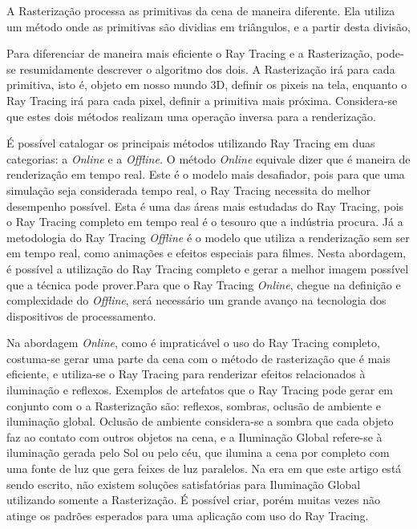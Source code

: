 \documentclass[journal]{IEEEtran}
\begin{document}
A Rasterização processa as primitivas da cena de maneira diferente. Ela
utiliza um método onde as primitivas são dividias em triângulos, e a partir desta
divisão, 

Para diferenciar de maneira mais eficiente o Ray Tracing e a Rasterização, pode-se
resumidamente descrever o algoritmo dos dois. A Rasterização irá  para cada
primitiva, isto é, objeto em nosso mundo 3D, definir os pixeis na tela, enquanto
o Ray Tracing irá para cada pixel, definir a primitiva mais próxima. Considera-se
que estes dois métodos realizam uma operação inversa para a renderização.
\cite{c11}

É possível catalogar os principais métodos utilizando Ray Tracing em duas categorias: 
a \emph{Online} e a \emph{Offline.} O método \emph{Online} equivale dizer que é
maneira de renderização em tempo real. Este é o modelo mais desafiador, pois para
que uma simulação seja considerada tempo real, o Ray Tracing necessita do melhor
desempenho possível. Esta é uma das áreas mais estudadas do Ray Tracing, pois 
o Ray Tracing completo em tempo real é o tesouro que a indústria procura. Já a
metodologia do Ray Tracing \emph{Offline} é o modelo que utiliza a renderização
sem ser em tempo real, como animações e efeitos especiais para filmes. Nesta
abordagem, é possível a utilização do Ray Tracing completo e gerar a melhor imagem
possível que a técnica pode prover.Para que o  Ray Tracing \emph{Online}, chegue na
definição e complexidade do \emph{Offline}, será necessário um grande avanço na 
tecnologia dos dispositivos de processamento.
\cite{c11}

Na abordagem \emph{Online}, como é impraticável o uso do Ray Tracing completo, costuma-se
gerar uma parte da cena com o método de rasterização que é mais eficiente, e utiliza-se
o Ray Tracing para renderizar efeitos relacionados à iluminação e reflexos. Exemplos
de artefatos que o Ray Tracing pode gerar em conjunto com o a Rasterização são:
reflexos, sombras, oclusão de ambiente e iluminação global. Oclusão de ambiente
considera-se a sombra que cada objeto faz ao contato com outros objetos na cena,
e a Iluminação Global refere-se à iluminação gerada pelo Sol ou pelo céu, que
ilumina a cena por completo com uma fonte de luz que gera feixes de luz paralelos.
Na era em que este artigo está sendo escrito, não existem soluções satisfatórias
para Iluminação Global utilizando somente a Rasterização. É possível criar, porém
muitas vezes não atinge os padrões esperados para uma aplicação com uso do 
Ray Tracing.
\end{document}
